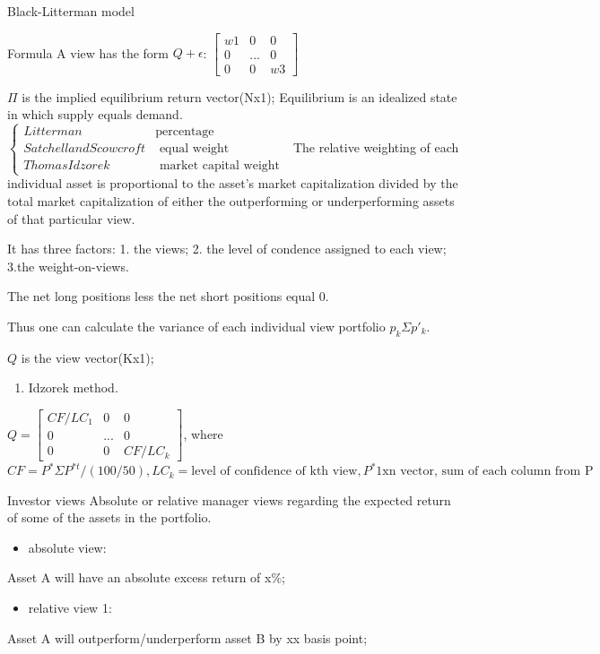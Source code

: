 \documentclass[presentation]{beamer}
\begin{document}
\begin{frame}[label={sec:orgheadline24}]{Black-Litterman model}
\begin{block}{Formula}
A view has the form \(Q+\epsilon\):
\(\begin{bmatrix}
w1 & 0 & 0\\
0 & ... & 0\\
0 & 0 & w3
\end{bmatrix}\)

\(\Pi\)
is the implied equilibrium return vector(Nx1); Equilibrium is an idealized state in which supply equals demand.
\(\begin{cases}
Litterman & \text {percentage} \\
Satchell and Scowcroft & \text{ equal weight } \\
Thomas Idzorek & \text{ market capital weight }
\end{cases}\)
The relative weighting of each individual asset is proportional to the asset’s market capitalization divided by the total market capitalization of either the outperforming or underperforming assets of that particular view.

It has three factors: 1. the views; 2. the level of condence assigned to each view; 3.the weight-on-views.

The net long positions less the net short positions equal 0.

Thus one can calculate the variance of each individual view portfolio \(p_k\Sigma p'_k\).

\(Q\)
is the view vector(Kx1);
\begin{enumerate}
\item Idzorek method.
\end{enumerate}
\(Q=\begin{bmatrix}
CF/LC_1 &0  &0 \\0
 &...  &0 \\0
 &0  &CF/LC_k
\end{bmatrix}\), where \(CF=P^*\Sigma P^{*t}/(100/50), LC_k=\text {level of confidence of kth view}, P^* \text {1xn vector, sum of each column from P}\)
\end{block}

\begin{block}{Investor views}
Absolute or relative manager views regarding the expected return of some of the assets in the portfolio.

\begin{itemize}
\item absolute view:
\end{itemize}
Asset A will have an absolute excess return of x\%;

\begin{itemize}
\item relative view 1:
\end{itemize}
Asset A will outperform/underperform asset B by xx basis point;


\end{block}
\end{frame}
\end{document}
